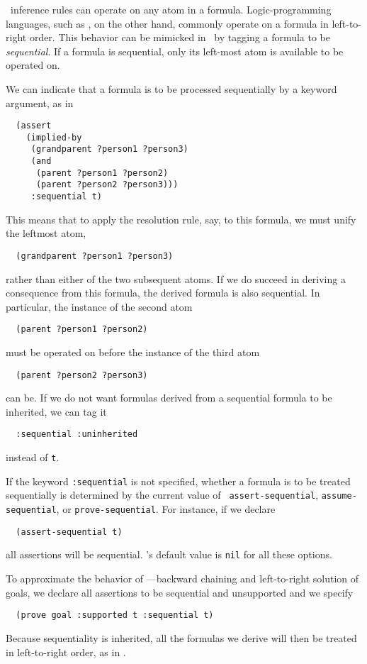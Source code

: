   \Snark\  inference rules can operate on any atom in a formula.
Logic-pro\-gram\-ming languages, such as \prolog\/, on the other hand, commonly
operate on a formula in left-to-right order.  This behavior can be mimicked
in \snark\  by tagging a formula to be {\em sequential}.  If a formula is
sequential, only its left-most atom is available to be operated on.

We can indicate that a formula is to be processed sequentially by a keyword
argument, as in
\begin{verbatim}
  (assert
    (implied-by
     (grandparent ?person1 ?person3)
     (and
      (parent ?person1 ?person2)
      (parent ?person2 ?person3)))
     :sequential t)
\end{verbatim}
This means that  to apply the resolution rule, say, to this
formula, we must unify the leftmost atom,
\begin{verbatim}
  (grandparent ?person1 ?person3)
\end{verbatim}
rather than either of the two subsequent atoms.  If we do succeed in deriving
a consequence from this formula, the derived formula is also sequential.  In
particular, the instance of the second atom
\begin{verbatim}
  (parent ?person1 ?person2)
\end{verbatim}
must be operated on before the instance of the third atom
\begin{verbatim}
  (parent ?person2 ?person3)
\end{verbatim}
can be.  If we do not want formulas derived from a sequential formula to be
inherited, we can tag it
\begin{verbatim}
  :sequential :uninherited
\end{verbatim}
instead of {\tt t}.

If the keyword {\tt :sequential} is not specified, whether a formula is to be
treated sequentially is determined by the current value of {\tt
assert-sequential}, {\tt assume-sequential}, or {\tt prove-sequential}.  For
instance, if we declare
\begin{verbatim}
  (assert-sequential t)
\end{verbatim}
all assertions will be sequential.
\Snark\/'s default value is {\tt nil} for
all these options.


To approximate the behavior of \prolog\/---backward chaining and left-to-right
solution of goals, we declare all
assertions to be sequential and unsupported and we specify
\begin{verbatim}
  (prove goal :supported t :sequential t)
\end{verbatim}
Because sequentiality is inherited, all the formulas we derive will then be
treated in left-to-right order, as in \prolog\/.

